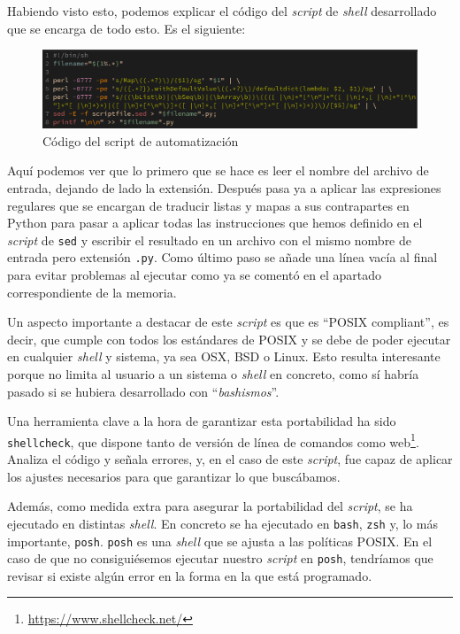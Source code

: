 \documentclass[12pt,twoside,titlepage]{report}
\newcommand{\quotes}[1]{``#1''}
\begin{document}
Habiendo visto esto, podemos explicar el código del \textit{script} de \textit{shell} desarrollado que se encarga de todo esto. Es el siguiente:

\begin{figure}[H]
	\includegraphics[scale=0.3]{autoregexscript.png}
	\centering
	\caption{Código del script de automatización}
	\label{fig:autoregex}
	\centering
\end{figure}

Aquí podemos ver que lo primero que se hace es leer el nombre del archivo de entrada, dejando de lado la extensión. Después pasa ya a aplicar las expresiones regulares que se encargan de traducir listas y mapas a sus contrapartes en Python para pasar a aplicar todas las instrucciones que hemos definido en el \textit{script} de \texttt{sed} y escribir el resultado en un archivo con el mismo nombre de entrada pero extensión \texttt{.py}. Como último paso se añade una línea vacía al final para evitar problemas al ejecutar como ya se comentó en el apartado correspondiente de la memoria.

Un aspecto importante a destacar de este \textit{script} es que es \quotes{POSIX compliant}, es decir, que cumple con todos los estándares de POSIX y se debe de poder ejecutar en cualquier \textit{shell} y sistema, ya sea OSX, BSD o Linux. Esto resulta interesante porque no limita al usuario a un sistema o \textit{shell} en concreto, como sí habría pasado si se hubiera desarrollado con \quotes{\textit{bashismos}}.

Una herramienta clave a la hora de garantizar esta portabilidad ha sido \texttt{shellcheck}, que dispone tanto de versión de línea de comandos como web\footnote{\url{https://www.shellcheck.net/}}. Analiza el código y señala errores, y, en el caso de este \textit{script}, fue capaz de aplicar los ajustes necesarios para que garantizar lo que buscábamos.

Además, como medida extra para asegurar la portabilidad del \textit{script}, se ha ejecutado en distintas \textit{shell}. En concreto se ha ejecutado en \texttt{bash}, \texttt{zsh} y, lo más importante, \texttt{posh}. \texttt{posh} es una \textit{shell} que se ajusta a las políticas POSIX. En el caso de que no consiguiésemos ejecutar nuestro \textit{script} en \texttt{posh}, tendríamos que revisar si existe algún error en la forma en la que está programado.
\end{document}
